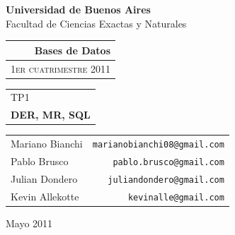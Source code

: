 \documentclass[12pt,titlepage]{article}
\begin{document}
\begin{titlepage}
\begin{center}
{\textbf{Universidad de Buenos Aires}\\Facultad de Ciencias Exactas y Naturales}

\vspace{1.5cm}

\begin{tabular}{r}
{\Large \bfseries Bases de Datos}\\
\hline
\textsc{\small 1er cuatrimestre 2011}\\
\end{tabular}
\vspace{2cm}

\begin{tabular}{l}
{\large TP1}\\
\textbf{\Huge DER, MR, SQL}\\
\end{tabular}

\vspace{1cm}


\vspace{1cm}

\begin{tabular}{lr}
Mariano Bianchi & \texttt{marianobianchi08@gmail.com}\\
Pablo Brusco & \texttt{pablo.brusco@gmail.com}\\
Julian Dondero & \texttt{juliandondero@gmail.com}\\
Kevin Allekotte & \texttt{kevinalle@gmail.com}\\
\end{tabular}

\vspace{2cm}

{\large Mayo 2011}

\end{center}
\end{titlepage}
\protect\setcounter{tocdepth}{1}
\end{document}
